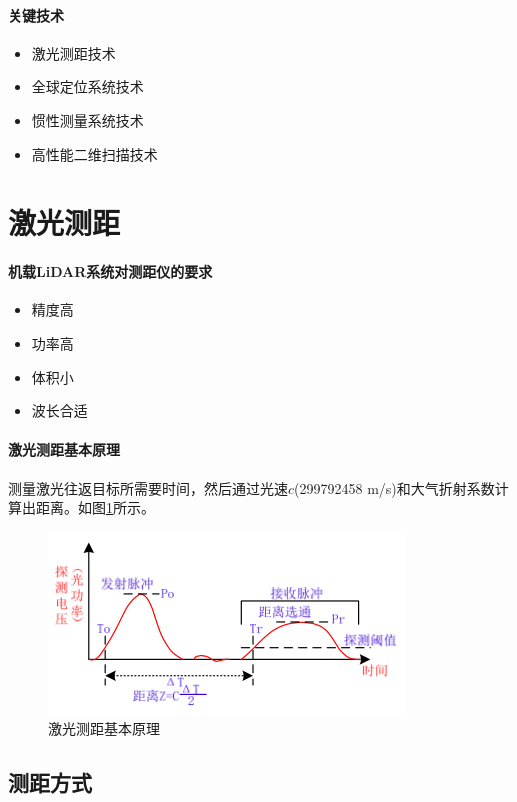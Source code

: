 \paragraph{关键技术}
\begin{itemize}
	\item 激光测距技术
	\item 全球定位系统技术
	\item 惯性测量系统技术
	\item 高性能二维扫描技术
\end{itemize}

\section{激光测距} %
\paragraph{机载LiDAR系统对测距仪的要求}
\begin{itemize}
	\item 精度高
	\item 功率高
	\item 体积小
	\item 波长合适
\end{itemize}

\paragraph{激光测距基本原理}测量激光往返目标所需要时间，然后通过光速$ c $(299792458 m/s)和大气折射系数计算出距离。如图\ref{fig:激光测距基本原理}所示。
\begin{figure}[htbp]
	\centering
	\includegraphics[width=0.7\linewidth]{figure/Chapter3/激光测距基本原理}
	\caption{激光测距基本原理}
	\label{fig:激光测距基本原理}
\end{figure}

\subsection{测距方式} %
